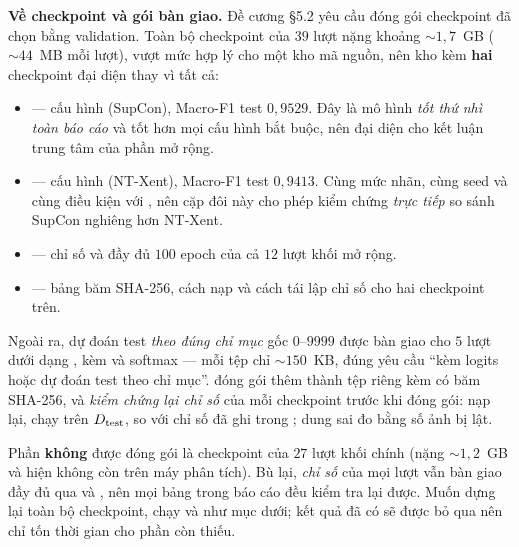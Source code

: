 \begin{keybox}
\textbf{Về checkpoint và gói bàn giao.} Đề cương §5.2 yêu cầu đóng gói checkpoint đã chọn bằng
validation. Toàn bộ checkpoint của $39$ lượt nặng khoảng $\sim1{,}7$~GB ($\sim44$~MB mỗi lượt),
vượt mức hợp lý cho một kho mã nguồn, nên kho kèm \textbf{hai} checkpoint đại diện thay vì tất cả:

\begin{itemize}[leftmargin=1.1cm,itemsep=2pt]
  \item {} — cấu hình  (SupCon), Macro-F1
        test $0{,}9529$. Đây là mô hình \emph{tốt thứ nhì toàn báo cáo} và tốt hơn mọi cấu hình
        bắt buộc, nên đại diện cho kết luận trung tâm của phần mở rộng.
  \item {} — cấu hình  (NT-Xent), Macro-F1
        test $0{,}9413$. Cùng mức nhãn, cùng seed và cùng điều kiện với , nên cặp đôi này
        cho phép kiểm chứng \emph{trực tiếp} so sánh SupCon nghiêng hơn NT-Xent.
  \item {} — chỉ số và  đầy đủ $100$ epoch của
        cả $12$ lượt khối mở rộng.
  \item {} — bảng băm SHA-256, cách nạp và cách tái lập
        chỉ số cho hai checkpoint trên.
\end{itemize}

Ngoài ra, dự đoán test \emph{theo đúng chỉ mục} gốc $0$--$9999$ được bàn giao cho $5$ lượt dưới
dạng , kèm  và  softmax — mỗi
tệp chỉ $\sim150$~KB, đúng yêu cầu \enquote{kèm logits hoặc dự đoán test theo chỉ mục}.
 đóng gói thêm thành tệp riêng kèm  có băm
SHA-256, và \emph{kiểm chứng lại chỉ số} của mỗi checkpoint trước khi đóng gói: nạp lại, chạy
trên $D_{\mathrm{test}}$, so với chỉ số đã ghi trong ; dung sai đo bằng số ảnh bị lật.

Phần \textbf{không} được đóng gói là checkpoint của $27$ lượt khối chính (nặng $\sim1{,}2$~GB và
hiện không còn trên máy phân tích). Bù lại, \emph{chỉ số} của mọi lượt vẫn bàn giao đầy đủ qua
 và , nên mọi bảng trong báo cáo đều kiểm tra
lại được. Muốn dựng lại toàn bộ checkpoint, chạy  và
 như mục dưới; kết quả đã có sẽ được bỏ qua nên chỉ tốn thời
gian cho phần còn thiếu.
\end{keybox}

